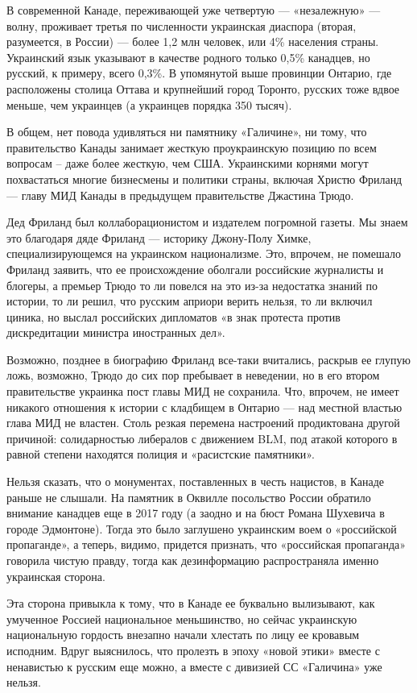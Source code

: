 В современной Канаде, переживающей уже четвертую --- «незалежную» --- волну,
проживает третья по численности украинская диаспора (вторая, разумеется, в
России) --- более 1,2 млн человек, или 4\% населения страны. Украинский язык
указывают в качестве родного только 0,5\% канадцев, но русский, к примеру, всего
0,3\%. В упомянутой выше провинции Онтарио, где расположены столица Оттава и
крупнейший город Торонто, русских тоже вдвое меньше, чем украинцев (а украинцев
порядка 350 тысяч).

В общем, нет повода удивляться ни памятнику «Галичине», ни тому, что
правительство Канады занимает жесткую проукраинскую позицию по всем вопросам –
даже более жесткую, чем США. Украинскими корнями могут похвастаться многие
бизнесмены и политики страны, включая Христю Фриланд --- главу МИД Канады в
предыдущем правительстве Джастина Трюдо.

Дед Фриланд был коллаборационистом и издателем погромной газеты. Мы знаем это
благодаря дяде Фриланд --- историку Джону-Полу Химке, специализирующемся на
украинском национализме. Это, впрочем, не помешало Фриланд заявить, что ее
происхождение оболгали российские журналисты и блогеры, а премьер Трюдо то ли
повелся на это из-за недостатка знаний по истории, то ли решил, что русским
априори верить нельзя, то ли включил циника, но выслал российских дипломатов «в
знак протеста против дискредитации министра иностранных дел».

Возможно, позднее в биографию Фриланд все-таки вчитались, раскрыв ее глупую
ложь, возможно, Трюдо до сих пор пребывает в неведении, но в его втором
правительстве украинка пост главы МИД не сохранила. Что, впрочем, не имеет
никакого отношения к истории с кладбищем в Онтарио --- над местной властью глава
МИД не властен. Столь резкая перемена настроений продиктована другой причиной:
солидарностью либералов с движением BLM, под атакой которого в равной степени
находятся полиция и «расистские памятники».

Нельзя сказать, что о монументах, поставленных в честь нацистов, в Канаде
раньше не слышали. На памятник в Оквилле посольство России обратило внимание
канадцев еще в 2017 году (а заодно и на бюст Романа Шухевича в городе
Эдмонтоне). Тогда это было заглушено украинским воем о «российской пропаганде»,
а теперь, видимо, придется признать, что «российская пропаганда» говорила
чистую правду, тогда как дезинформацию распространяла именно украинская
сторона.

Эта сторона привыкла к тому, что в Канаде ее буквально вылизывают, как
умученное Россией национальное меньшинство, но сейчас украинскую национальную
гордость внезапно начали хлестать по лицу ее кровавым исподним. Вдруг
выяснилось, что пролезть в эпоху «новой этики» вместе с ненавистью к русским
еще можно, а вместе с дивизией СС «Галичина» уже нельзя.

